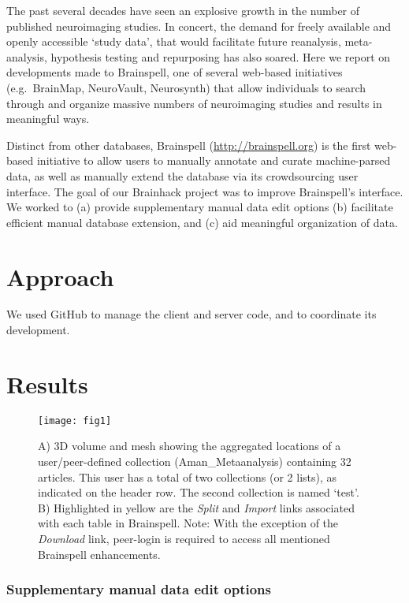 \documentclass[twocolumn]{bmcart}%
\begin{document}
The past several decades have seen an explosive growth in the number of
published neuroimaging studies. In concert, the demand for freely
available and openly accessible `study data', that would facilitate
future reanalysis, meta-analysis, hypothesis testing and repurposing has
also soared. Here we report on developments made to
Brainspell\cite{brainspell}, one of several web-based initiatives
(e.g.~BrainMap\cite{fox1994}, NeuroVault\cite{neurovault},
Neurosynth\cite{neurosynth}) that allow individuals to search through
and organize massive numbers of neuroimaging studies and results in
meaningful ways.

Distinct from other databases, Brainspell (\url{http://brainspell.org})
is the first web-based initiative to allow users to manually annotate
and curate machine-parsed data, as well as manually extend the database
via its crowdsourcing user interface. The goal of our Brainhack project
was to improve Brainspell's interface. We worked to (a) provide
supplementary manual data edit options (b) facilitate efficient manual
database extension, and (c) aid meaningful organization of data.

\section{Approach}\label{approach}

We used GitHub to manage the client and server code, and to coordinate
its development.

\section{Results}\label{results}

\begin{figure}[h!]
  \texttt{[image: fig1]}
  \caption{\label{centfig}A) 3D volume and mesh showing the aggregated locations of a user/peer-defined collection (Aman\_Metaanalysis) containing 32 articles. This user has a total of two collections (or 2 lists), as indicated on the header row. The second collection is named `test'. B) Highlighted in yellow are the \emph{Split} and \emph{Import} links associated with each table in Brainspell. Note: With the exception of the \emph{Download} link, peer-login is required to access all mentioned Brainspell enhancements.}
\end{figure}

\subsubsection{Supplementary manual data edit
options}\label{supplementary-manual-data-edit-options}
\end{document}

